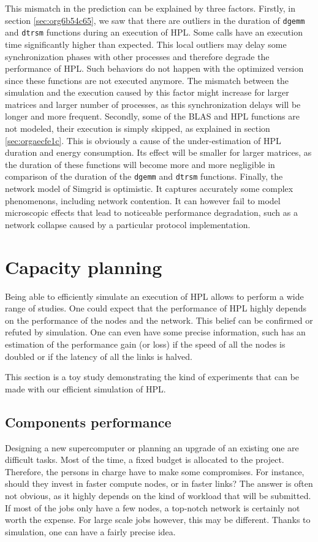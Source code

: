 \documentclass[12pt, a4paper]{memoir}
\begin{document}
This mismatch in the prediction can be explained by three factors.  Firstly, in section \ref{sec:org6b54c65}, we saw that
there are outliers in the duration of \texttt{dgemm} and \texttt{dtrsm} functions during an execution of HPL. Some calls have an
execution time significantly higher than expected. This local outliers may delay some synchronization phases with
other processes and therefore degrade the performance of HPL. Such behaviors do not happen with the optimized version
since these functions are not executed anymore. The mismatch between the simulation and the execution caused by this
factor might increase for larger matrices and larger number of processes, as this synchronization delays will be
longer and more frequent.  Secondly, some of the BLAS and HPL functions are not modeled, their execution is simply
skipped, as explained in section \ref{sec:orgaecfe1c}. This is obviously a cause of the under-estimation of HPL
duration and energy consumption. Its effect will be smaller for larger matrices, as the duration of these functions
will become more and more negligible in comparison of the duration of the \texttt{dgemm} and \texttt{dtrsm} functions.  Finally, the
network model of Simgrid is optimistic. It captures accurately some complex phenomenons, including network
contention. It can however fail to model microscopic effects that lead to noticeable performance degradation, such as
a network collapse caused by a particular protocol implementation.
\section{Capacity planning}
\label{sec:org478d8a6}
Being able to efficiently simulate an execution of HPL allows to perform a wide range of studies. One could expect
that the performance of HPL highly depends on the performance of the nodes and the network. This belief can be
confirmed or refuted by simulation. One can even have some precise information, such has an estimation of the
performance gain (or loss) if the speed of all the nodes is doubled or if the latency of all the links is halved.

This section is a toy study demonstrating the kind of experiments that can be made with our efficient simulation of
HPL.
\subsection{Components performance}
\label{sec:org1f1c821}
Designing a new supercomputer or planning an upgrade of an existing one are difficult tasks. Most of the time, a
fixed budget is allocated to the project. Therefore, the persons in charge have to make some compromises. For
instance, should they invest in faster compute nodes, or in faster links? The answer is often not obvious, as it
highly depends on the kind of workload that will be submitted. If most of the jobs only have a few nodes, a
top-notch network is certainly not worth the expense. For large scale jobs however, this may be different. Thanks to
simulation, one can have a fairly precise idea.
\end{document}
